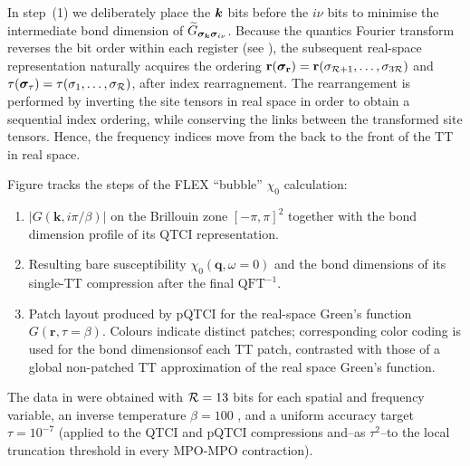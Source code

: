 In step~(1) we deliberately place the \(\boldsymbol{k}\) bits before the \(i\nu\) bits to minimise the intermediate bond dimension of
\(\widetilde G_{\boldsymbol{\sigma}_{\boldsymbol{k}}\boldsymbol{\sigma}_{i\nu}}\). Because the quantics Fourier transform reverses the bit order within each register (see ), the subsequent real-space representation naturally acquires the ordering
\(\mathbf r(\boldsymbol{\sigma}_{\mathbf r})=\mathbf r(\sigma_{\mathcal R+1},\dots,
  \sigma_{3\mathcal R})\) and
\(\tau(\boldsymbol{\sigma}_{\tau})=\tau(\sigma_{1},\dots,\sigma_{\mathcal R})\),
after index rearragnement. The rearrangement is performed by inverting the site tensors in real space in order to obtain a sequential index ordering, while conserving the links between the transformed site tensors. Hence, the frequency indices move from the back to the front of the TT in real space. 

Figure  tracks the steps of the FLEX ``bubble'' $\chi_0$ calculation:
\begingroup
\renewcommand{\labelenumi}{($\alph{enumi}$)}
\begin{enumerate}
    \item  \(\lvert G(\mathbf k,i\pi/\beta)\rvert\) on the Brillouin zone
  \([-\pi,\pi]^{2}\) together with the bond dimension profile of its QTCI representation.
\item Resulting bare susceptibility
  \(\chi_{0}(\mathbf q,\omega\!=\!0)\) and the bond dimensions of its single-TT compression after the final $\text{QFT}^{-1}$.
\item Patch layout produced by pQTCI for the real-space Green’s function \(G(\mathbf r,\tau=\beta)\). Colours indicate distinct patches; corresponding color coding is used for the bond dimensionsof each TT patch, contrasted with those of a global non-patched TT approximation of the real space Green's function.
\end{enumerate}
\endgroup 

The data in  were obtained with $\mathcal{R}=13$ bits for each spatial and frequency variable, an inverse
temperature $\beta=100$ , and a uniform accuracy target $\tau=10^{-7}$ (applied to the QTCI and pQTCI compressions and--as $\tau^2$--to the local truncation threshold in every MPO-MPO contraction).

